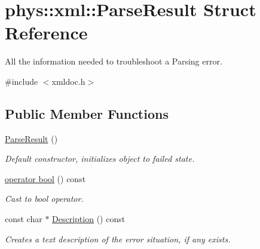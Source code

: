 \hypertarget{structphys_1_1xml_1_1ParseResult}{
\section{phys::xml::ParseResult Struct Reference}
\label{d5/dea/structphys_1_1xml_1_1ParseResult}
}


All the information needed to troubleshoot a Parsing error.  




{\ttfamily \#include $<$xmldoc.h$>$}

\subsection*{Public Member Functions}
\begin{DoxyCompactItemize}
\item 
\hypertarget{structphys_1_1xml_1_1ParseResult_aa7520df050e866122a0cf67bf306e323}{
\hyperlink{structphys_1_1xml_1_1ParseResult_aa7520df050e866122a0cf67bf306e323}{ParseResult} ()}
\label{d5/dea/structphys_1_1xml_1_1ParseResult_aa7520df050e866122a0cf67bf306e323}

\begin{DoxyCompactList}\small\item\em Default constructor, initializes object to failed state. \item\end{DoxyCompactList}\item 
\hyperlink{structphys_1_1xml_1_1ParseResult_a95c9989865c1bace7846995166a13e31}{operator bool} () const 
\begin{DoxyCompactList}\small\item\em Cast to bool operator. \item\end{DoxyCompactList}\item 
const char $\ast$ \hyperlink{structphys_1_1xml_1_1ParseResult_aeda9dd881b93496c5500cb810b2e937d}{Description} () const 
\begin{DoxyCompactList}\small\item\em Creates a text description of the error situation, if any exists. \item\end{DoxyCompactList}\end{DoxyCompactItemize}
